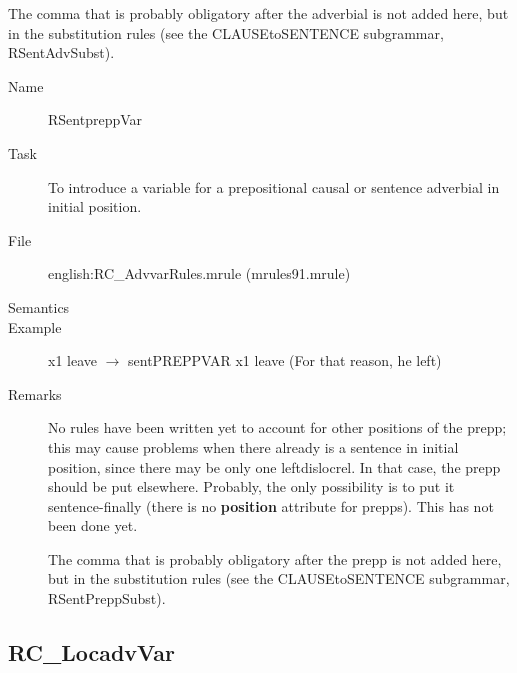 \begin{description}
\begin{description}
The comma that is probably obligatory after the adverbial
is not added here, but in the substitution rules (see 
the CLAUSEtoSENTENCE subgrammar, RSentAdvSubst).
\end{description}

\vspace{1 cm}
\begin{description}
\item[Name] RSentpreppVar
\item[Task] To introduce a variable for a prepositional causal or 
sentence adverbial in initial position. 
\item[File] english:RC\_AdvvarRules.mrule (mrules91.mrule)
\item[Semantics]
\item[Example] x1 leave $\rightarrow$ sentPREPPVAR x1 leave (For that reason, 
he left)
\item[Remarks] No rules have been written yet to account for other positions 
of the prepp; this may cause problems when there already is a sentence in 
initial position, since there may be only one leftdislocrel. 
In that case, the prepp should be put elsewhere. Probably, the only possibility 
is to put it sentence-finally (there is no {\bf position} attribute for prepps).
 This has not been done yet.

The comma that is probably obligatory after the prepp
is not added here, but in the substitution rules (see 
the CLAUSEtoSENTENCE subgrammar, RSentPreppSubst).
\end{description}

\end{description}

\newpage
\subsection{RC\_LocadvVar}

